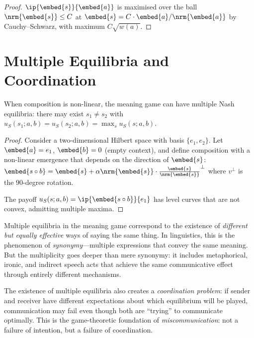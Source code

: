 \begin{proof}
$\ip{\embed{s}}{\embed{a}}$ is maximised over the ball $\nrm{\embed{s}} \leq C$
at $\embed{s} = C \cdot \embed{a} / \nrm{\embed{a}}$ by Cauchy--Schwarz,
with maximum $C \sqrt{w(a)}$.
\end{proof}

\section{Multiple Equilibria and Coordination}

\begin{theorem}
\label{thm:multiplicity}
When composition is non-linear, the meaning game can have multiple Nash
equilibria: there may exist $s_1 \neq s_2$ with
$u_S(s_1; a, b) = u_S(s_2; a, b) = \max_s u_S(s; a, b)$.
\end{theorem}

\begin{proof}
Consider a two-dimensional Hilbert space with basis $\{e_1, e_2\}$.
Let $\embed{a} = e_1$, $\embed{b} = 0$ (empty context), and define
composition with a non-linear emergence that depends on the direction
of $\embed{s}$:
$\embed{s \compose b} = \embed{s} + \alpha \nrm{\embed{s}} \cdot
\frac{\embed{s}}{\nrm{\embed{s}}}^{\perp}$
where $v^{\perp}$ is the $90$-degree rotation.

The payoff $u_S(s; a, b) = \ip{\embed{s \compose b}}{e_1}$ has level curves
that are not convex, admitting multiple maxima.
\end{proof}

\begin{interpretation}
Multiple equilibria in the meaning game correspond to the existence of
\emph{different but equally effective} ways of saying the same thing.  In
linguistics, this is the phenomenon of \emph{synonymy}---multiple
expressions that convey the same meaning.  But the multiplicity goes deeper
than mere synonymy: it includes metaphorical, ironic, and indirect speech
acts that achieve the same communicative effect through entirely different
mechanisms.

The existence of multiple equilibria also creates a \emph{coordination
problem}: if sender and receiver have different expectations about which
equilibrium will be played, communication may fail even though both are
``trying'' to communicate optimally.  This is the game-theoretic foundation
of \emph{miscommunication}: not a failure of intention, but a failure of
coordination.
\end{interpretation}

